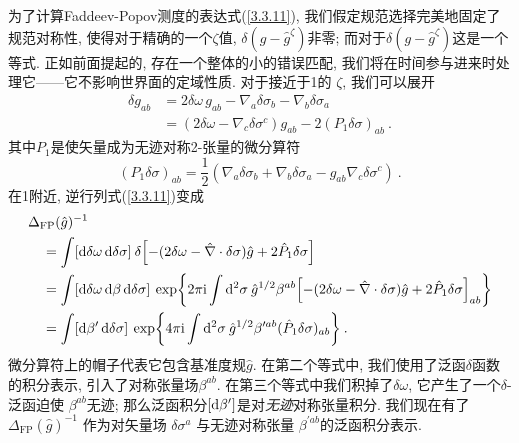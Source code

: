 为了计算Faddeev-Popov测度的表达式(\ref{3.3.11}), 我们假定规范选择完美地固定了规范对称性, 使得对于精确的一个$\zeta$值, $\delta(g-\hat{g} ^\zeta)$非零; 而对于$\delta(g-\hat{g}^ \zeta)$这是一个等式. 正如前面提起的, 存在一个整体的小的错误匹配, 我们将在时间参与进来时处理它——它不影响世界面的定域性质. 对于接近于1的 $\zeta$, 我们可以展开
\begin{align}
\delta g_{a b} &=2 \delta \omega \,g_{a b}-\nabla_{a} \delta \sigma_{b}-\nabla_{b} \delta \sigma_{a} \nonumber \\
&=(2 \delta \omega-\nabla_{c} \delta \sigma^{c}) g_{a b}-2(P_{1} \delta \sigma)_{a b} \:. \label{3.3.16}
\end{align}
其中$P_1$是使矢量成为无迹对称2-张量的微分算符
\begin{equation}
(P_{1} \delta \sigma)_{a b}=\frac{1}{2}(\nabla_{a} \delta \sigma_{b}+\nabla_{b} \delta \sigma_{a}-g_{a b} \nabla_{c} \delta \sigma^{c}) \:. \label{3.3.17}
\end{equation}
在1附近, 逆行列式(\ref{3.3.11})变成
\begin{align}
&\Delta_{\mathrm{FP}}(\hat{g})^{-1} \nonumber \\
&\quad =\int[\mathrm{d} \delta \omega \, \mathrm{d} \delta \sigma]\: \delta\Bigl[-(2 \delta \omega-\hat{\nabla} \cdot \delta \sigma) \hat{g}+2 \hat{P}_{1} \delta \sigma\Bigr] \nonumber \\
&\quad =\int[\mathrm{d} \delta \omega \, \mathrm{d} \beta\, \mathrm{d} \delta \sigma] \: \exp \biggl\{2 \pi \mathrm{i} \int \mathrm{d}^{2} \sigma \: \hat{g}^{1 / 2} \beta^{a b}
\Bigl[-(2 \delta \omega-\hat{\nabla} \cdot \delta \sigma) \hat{g}+2 \hat{P}_{1} \delta \sigma\Bigr]_{a b}\biggr\} \nonumber \\
&\quad =\int[\mathrm{d} \beta^{\prime}\, \mathrm{d} \delta \sigma]\: \exp \biggl\{4 \pi \mathrm{i} \int \mathrm{d}^{2} \sigma \: \hat{g}^{1 / 2} \beta^{\prime a b}
(\hat{P}_{1} \delta \sigma)_{a b}\biggr\} \:. \label{3.3.18}
\end{align}
微分算符上的帽子代表它包含基准度规$\hat{g}$. 在第二个等式中, 我们使用了泛函$\delta$函数的积分表示, 引入了对称张量场$\beta^{a b} $. 
在第三个等式中我们积掉了$\delta \omega$, 它产生了一个$\delta$-泛函迫使 $\beta^{a b}$无迹; 那么泛函积分$[\mathrm{d} \beta^{\prime}]$是对\emph{无迹}对称张量积分. 
我们现在有了 $\Delta_{\mathrm{FP}}(\hat{g})^{-1}$ 作为对矢量场 $\delta \sigma^{a}$ 与无迹对称张量 $\beta^{\prime a b}$的泛函积分表示.

